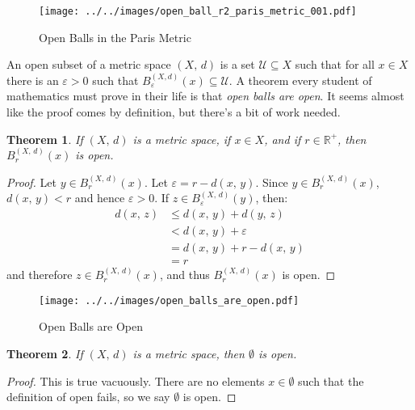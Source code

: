 \documentclass{article}
\theoremstyle{plain}
\newtheorem{theorem}{Theorem}[section]
\theoremstyle{normal}
\newenvironment{definition}{%
    \pushQED{\qed}\renewcommand{\qedsymbol}{$\blacksquare$}\definitionx%
}{%
    \popQED\enddefinitionx%
}
\begin{document}
        \begin{figure}
            \centering
            \texttt{[image: ../../images/open\_ball\_r2\_paris\_metric\_001.pdf]}
            \caption{Open Balls in the Paris Metric}
            \label{fig:open_ball_r2_paris_metric_001}
        \end{figure}
        \begin{definition}[\textbf{Open Subsets}]
            An open subset of a metric space $(X,\,d)$ is a set
            $\mathcal{U}\subseteq{X}$ such that for all
            $x\in{X}$ there is an $\varepsilon>0$ such that
            $B_{\varepsilon}^{(X,d)}(x)\subseteq\mathcal{U}$.
        \end{definition}
        A theorem every student of mathematics must prove in their life
        is that \textit{open balls are open}. It seems almost like the proof
        comes by definition, but there's a bit of work needed.
        \begin{theorem}
            If $(X,\,d)$ is a metric space, if $x\in{X}$, and if
            $r\in\mathbb{R}^{+}$, then $B_{r}^{(X,\,d)}(x)$ is open.
        \end{theorem}
        \begin{proof}
            Let $y\in{B}_{r}^{(X,\,d)}(x)$. Let
            $\varepsilon=r-d(x,\,y)$. Since
            $y\in{B}_{r}^{(X,\,d)}(x)$, $d(x,\,y)<r$ and hence
            $\varepsilon>0$. If
            $z\in{B}_{\varepsilon}^{(X,\,d)}(y)$, then:
            \begin{align}
                d(x,\,z)&\leq{d}(x,\,y)+d(y,\,z)\\
                    &<d(x,\,y)+\varepsilon\\
                    &=d(x,\,y)+r-d(x,\,y)\\
                    &=r
            \end{align}
            and therefore $z\in{B}_{r}^{(X,\,d)}(x)$, and thus
            $B_{r}^{(X,\,d)}(x)$ is open.
        \end{proof}
        \begin{figure}
            \centering
            \texttt{[image: ../../images/open\_balls\_are\_open.pdf]}
            \caption{Open Balls are Open}
            \label{fig:open_balls_are_open}
        \end{figure}
        \begin{theorem}
            If $(X,\,d)$ is a metric space, then $\emptyset$ is open.
        \end{theorem}
        \begin{proof}
            This is true vacuously. There are no elements
            $x\in\emptyset$ such that the definition of open fails, so
            we say $\emptyset$ is open.
        \end{proof}
\end{document}
